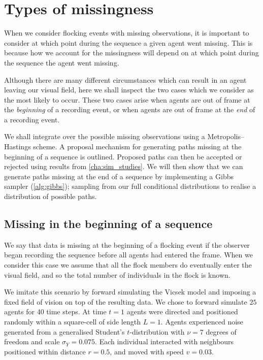 \section{Types of missingness}
\label{sec:missing_types}

When we consider flocking events with missing observations, it is important to
consider at which point during the sequence a given agent went missing. This is
because how we account for the missingness will depend on at which point during
the sequence the agent went missing.

Although there are many different circumstances which can result in an agent
leaving our visual field, here we shall inspect the two cases which we consider
as the most likely to occur. These two cases arise when agents are out of frame
at the \emph{beginning} of a recording event, or when agents are out of frame
at the \emph{end} of a recording event.

We shall integrate over the possible missing observations using a
Metropolis--Hastings scheme. A proposal mechanism for generating paths missing
at the beginning of a sequence is outlined. Proposed paths can then be accepted
or rejected using results from \cref{cha:sim_studies}. We will then show that
we can generate paths missing at the end of a sequence by implementing a Gibbs
sampler (\cref{alg:gibbs}); sampling from our full conditional distributions to
realise a distribution of possible paths.

\subsection{Missing in the beginning of a sequence}
\label{ssec:beg_missing}

We say that data is missing at the beginning of a flocking event if the
observer began recording the sequence before all agents had entered the frame.
When we consider this case we assume that all the flock members do eventually
enter the visual field, and so the total number of individuals in the flock is
known.

We imitate this scenario by forward simulating the Vicsek model and imposing a
fixed field of vision on top of the resulting data. We chose to forward
simulate $25$ agents for $40$ time steps. At time $t=1$ agents were directed
and positioned randomly within a square-cell of side length $L=1$. Agents
experienced noise generated from a generalised Student's $t$-distribution with
$\nu=7$ degrees of freedom and scale $\sigma_Y=0.075$. Each individual
interacted with neighbours positioned within distance $r=0.5$, and moved with
speed $v=0.03$.

